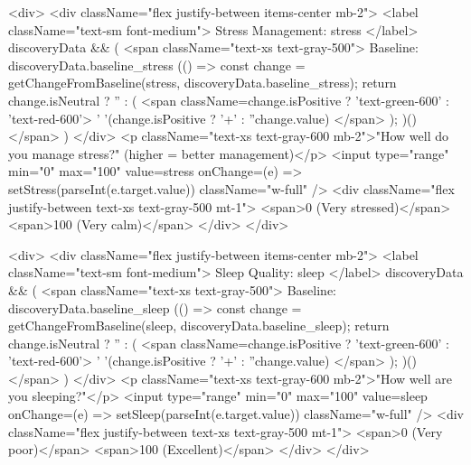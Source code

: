 {            <div>
              <div className="flex justify-between items-center mb-2">
                <label className="text-sm font-medium">
                  Stress Management: {stress}
                </label>
                {discoveryData && (
                  <span className="text-xs text-gray-500">
                    Baseline: {discoveryData.baseline_stress}
                    {(() => {
                      const change = getChangeFromBaseline(stress, discoveryData.baseline_stress);
                      return change.isNeutral ? '' : (
                        <span className={change.isPositive ? 'text-green-600' : 'text-red-600'}>
                          {' '}({change.isPositive ? '+' : ''}{change.value})
                        </span>
                      );
                    })()}
                  </span>
                )}
              </div>
              <p className="text-xs text-gray-600 mb-2">"How well do you manage stress?" (higher = better management)</p>
              <input
                type="range"
                min="0"
                max="100"
                value={stress}
                onChange={(e) => setStress(parseInt(e.target.value))}
                className="w-full"
              />
              <div className="flex justify-between text-xs text-gray-500 mt-1">
                <span>0 (Very stressed)</span>
                <span>100 (Very calm)</span>
              </div>
            </div>

            <div>
              <div className="flex justify-between items-center mb-2">
                <label className="text-sm font-medium">
                  Sleep Quality: {sleep}
                </label>
                {discoveryData && (
                  <span className="text-xs text-gray-500">
                    Baseline: {discoveryData.baseline_sleep}
                    {(() => {
                      const change = getChangeFromBaseline(sleep, discoveryData.baseline_sleep);
                      return change.isNeutral ? '' : (
                        <span className={change.isPositive ? 'text-green-600' : 'text-red-600'}>
                          {' '}({change.isPositive ? '+' : ''}{change.value})
                        </span>
                      );
                    })()}
                  </span>
                )}
              </div>
              <p className="text-xs text-gray-600 mb-2">"How well are you sleeping?"</p>
              <input
                type="range"
                min="0"
                max="100"
                value={sleep}
                onChange={(e) => setSleep(parseInt(e.target.value))}
                className="w-full"
              />
              <div className="flex justify-between text-xs text-gray-500 mt-1">
                <span>0 (Very poor)</span>
                <span>100 (Excellent)</span>
              </div>
            </div>

}
